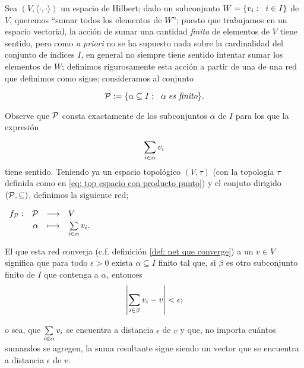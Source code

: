 Sea $(V, \langle \cdot , \cdot\rangle)$ un espacio de Hilbert;
dado un subconjunto $W = \{ v_{i} : \hspace{0.2cm} i \in I \}$
de $V$, queremos ``sumar todos los elementos de 
$W$''; puesto que trabajamos en un espacio vectorial,
la acción de sumar una cantidad \textit{finita} de elementos
de $V$ tiene sentido, pero como
\textit{a priori} no se ha supuesto nada
sobre la cardinalidad del conjunto de índices $I$, 
en general no siempre tiene sentido intentar sumar los elementos de $W$;
definimos rigurosamente esta acción a partir de una
de una red que definimos como sigue; consideramos al conjunto


\begin{comment}
{
\Huge{$\alpha$}

\Huge{$\beta$}\\

\Huge{$\gamma$}
}
\end{comment}

\begin{equation}
\label{eq0: 14ap}
\mathcal{P} := \{ \alpha \subseteq I : \hspace{0.2cm} \alpha \hspace{0.1cm} \textit{es finito} \}.
\end{equation}

\noindent 
Observe que $\mathcal{P}$ consta exactamente de los subconjuntos $\alpha$
de $I$ para los que la expresión 
\[
\sum\limits_{i \in \alpha}^{}v_{i}
\]
tiene sentido. Teniendo ya un espacio topológico $(V, \tau)$
(con la topología $\tau$ definida como en
\eqref{eq: top espacio con producto punto})
y el conjuto dirigido $(\mathcal{P}, \subseteq)$,
definimos la siguiente red;

\begin{center}
\label{eq: net a partir de un subconjunto de un espacio de Hilbert}
$\text{${\begin{array}{crcl} f_{\mathcal{P}}: & \mathcal{P} & \longrightarrow & V \\ \, & \alpha & \longmapsto &  \sum\limits_{i \in \alpha}^{}v_{i}. \end{array}}$}$
\end{center}

El que esta red converja (c.f. definición
\ref{def: net que converge}) a un $v \in V$ significa que
para todo $\epsilon >0$ exista $\alpha \subseteq I$
finito tal que, si $\beta$ es otro subconjunto finito de $I$
que contenga a $\alpha$, entonces
\[
\left| \sum\limits_{i \in \beta}^{}v_{i} - v \right| < \epsilon;
\]

\noindent o sea, que $\sum\limits_{i \in \alpha}^{}v_{i}$
se encuentra a distancia $\epsilon$ de $v$ y que, no importa
cuántos sumandos se agregen, la suma resultante sigue siendo 
un vector que se encuentra a 
distancia $\epsilon$ de $v$.

